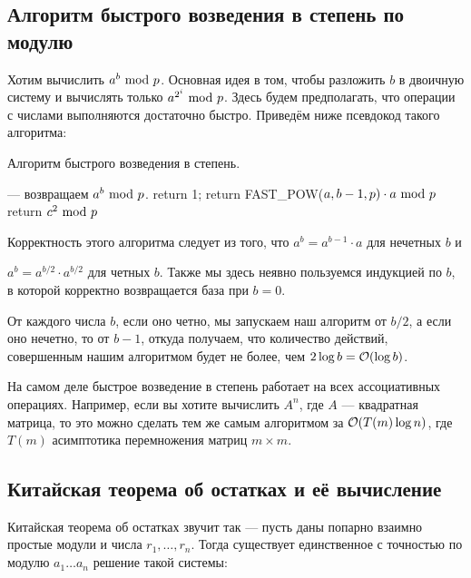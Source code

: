 \documentclass[a4paper, 12pt]{article}
\begin{document}
\subsection{Алгоритм быстрого возведения в степень по модулю}

Хотим вычислить $a^b \ \text{mod} \  p$. Основная идея в том, чтобы разложить $b$ в двоичную
систему и вычислять только $a^{2^i} \ \text{mod} \  p$. Здесь будем
предполагать, что операции с числами выполняются достаточно быстро.
Приведём ниже псевдокод такого алгоритма:

\begin{algorithm}
  \caption{Алгоритм быстрого возведения в степень.}
  \begin{algorithmic}[1]
     \Comment --- возвращаем $a^b \ \text{mod} \  p$.
      \State return 1;
    \EndIf
      \State return FAST\_POW($a, b - 1, p) \cdot a \ \text{mod} \  p$
    \Else
      \State return $c^2 \ \text{mod} \  p$
    \EndIf
    \EndFunction
  \end{algorithmic}
\end{algorithm}  

Корректность этого алгоритма следует из того, что $a^b = a^{b - 1}\cdot a$ 
для нечетных $b$ и 

$a^b = a^{b/2} \cdot a^{b/2}$ для четных $b$. Также мы
здесь неявно пользуемся индукцией по $b$, в которой корректно возвращается база при $b = 0$.

От каждого числа $b$, если оно четно, мы запускаем наш алгоритм от $b/2$, а если
оно нечетно, то от $b - 1$, откуда получаем, что количество
действий, совершенным нашим алгоритмом будет не более, чем $2\log b = \mathcal{O}(\log b)$.

\begin{Commentary}
  На самом деле быстрое возведение в степень работает на всех ассоциативных операциях.
  Например, если вы хотите вычислить $A^n$, где $A$ --- квадратная матрица, то
  это можно сделать тем же самым алгоритмом
  за $\mathcal{O}(T(m)\log n)$, где $T(m)$ асимптотика перемножения
  матриц $m \times m$.
\end{Commentary}

\subsection{Китайская теорема об остатках и её вычисление}

Китайская теорема об остатках звучит так --- пусть даны попарно взаимно простые
модули и числа $r_1, \ldots, r_n$. Тогда существует единственное с точностью по
модулю $a_1 \ldots a_n$ решение такой системы:
\end{document}
